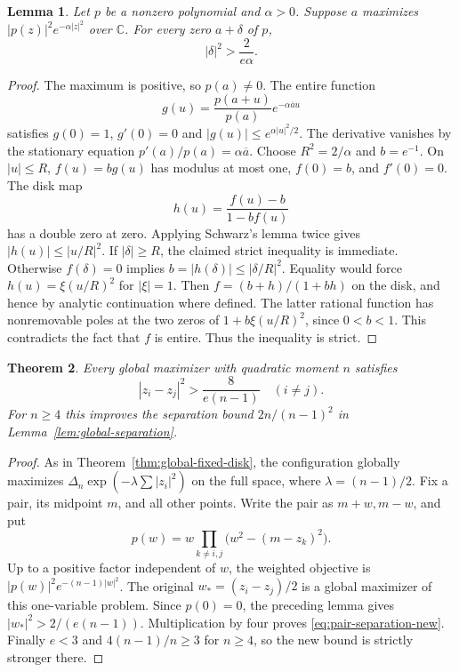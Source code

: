 \documentclass[11pt]{article}
\newtheorem{theorem}{Theorem}[section]
\newtheorem{lemma}[theorem]{Lemma}
\theoremstyle{remark}
\newcommand{\C}{\mathbb C}
\numberwithin{equation}{section}
\begin{document}
\begin{lemma}\label{lem:weighted-zero-separation}
Let $p$ be a nonzero polynomial and $\alpha>0$. Suppose $a$ maximizes
$|p(z)|^2e^{-\alpha|z|^2}$ over $\C$. For every zero $a+\delta$ of $p$,
\[
                         |\delta|^2>\frac{2}{e\alpha}.
\]
\end{lemma}
\begin{proof}
The maximum is positive, so $p(a)\ne0$. The entire function
\[
 g(u)=\frac{p(a+u)}{p(a)}e^{-\alpha\overline a u}
\]
satisfies $g(0)=1$, $g'(0)=0$ and
$|g(u)|\le e^{\alpha|u|^2/2}$. The derivative vanishes by the
stationary equation $p'(a)/p(a)=\alpha\overline a$.
Choose $R^2=2/\alpha$ and $b=e^{-1}$.
On $|u|\le R$, $f(u)=bg(u)$ has modulus at most one, $f(0)=b$,
and $f'(0)=0$. The disk map
\[
 h(u)=\frac{f(u)-b}{1-bf(u)}
\]
has a double zero at zero. Applying Schwarz's lemma twice gives
$|h(u)|\le |u/R|^2$.
If $|\delta|\ge R$, the claimed strict inequality is immediate.
Otherwise $f(\delta)=0$ implies
$b=|h(\delta)|\le |\delta/R|^2$.
Equality would force $h(u)=\xi(u/R)^2$ for $|\xi|=1$.
Then $f=(b+h)/(1+bh)$ on the disk, and hence by analytic continuation
where defined. The latter rational function has nonremovable poles
at the two zeros of $1+b\xi(u/R)^2$, since $0<b<1$.
This contradicts the fact that $f$ is entire. Thus the inequality
is strict.
\end{proof}

\begin{theorem}\label{thm:pair-separation}
Every global maximizer with quadratic moment $n$ satisfies
\begin{equation}\label{eq:pair-separation-new}
             |z_i-z_j|^2>\frac{8}{e(n-1)}\quad(i\ne j).
\end{equation}
For $n\ge4$ this improves the separation bound
$2n/(n-1)^2$ in Lemma~\ref{lem:global-separation}.
\end{theorem}
\begin{proof}
As in Theorem~\ref{thm:global-fixed-disk}, the configuration globally
maximizes $\Delta_n\exp(-\lambda\sum|z_i|^2)$ on the full space,
where $\lambda=(n-1)/2$.
Fix a pair, its midpoint $m$, and all other points. Write the pair
as $m+w,m-w$, and put
\[
 p(w)=w\prod_{k\ne i,j}\bigl(w^2-(m-z_k)^2\bigr).
\]
Up to a positive factor independent of $w$, the weighted objective
is $|p(w)|^2e^{-(n-1)|w|^2}$.
The original $w_*=(z_i-z_j)/2$ is a global maximizer of this
one-variable problem. Since $p(0)=0$, the preceding lemma gives
$|w_*|^2>2/(e(n-1))$. Multiplication by four proves
\eqref{eq:pair-separation-new}.
Finally $e<3$ and $4(n-1)/n\ge3$ for $n\ge4$, so the new
bound is strictly stronger there.
\end{proof}
\end{document}
